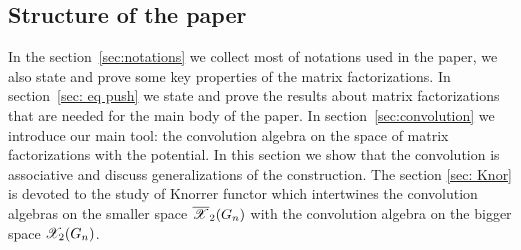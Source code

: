 \documentclass[10pt]{amsart}
\begin{document}
%

\subsection{Structure of the paper}
In the section~\ref{sec:notations} we collect most of notations used in the paper, we also state and prove some key
properties of the matrix factorizations. In section~\ref{sec: eq push} we  state
and prove the results about matrix factorizations that are needed for the main body of the paper.
In section~\ref{sec:convolution} we introduce our main tool: the convolution algebra on the space of
matrix factorizations with the potential. In this section we show that the convolution is associative and discuss generalizations of the construction.
The section \ref{sec: Knor} is devoted to the study of Knorrer functor which intertwines the convolution algebras on the smaller space $\overline{\mathscr{X}}_2(G_n)$ with
the convolution algebra on the bigger space $\mathscr{X}_2(G_n)$.
\end{document}
